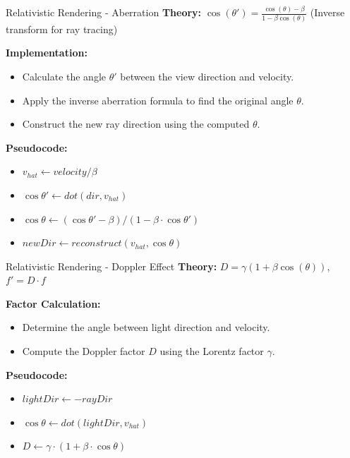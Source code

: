 \documentclass[aspectratio=169,xcolor=dvipsnames]{beamer}
\begin{document}
\begin{frame}{Relativistic Rendering - Aberration}
    \textbf{Theory:} $\cos(\theta') = \frac{\cos(\theta) - \beta}{1 - \beta \cos(\theta)}$ (Inverse transform for ray tracing)
    
    \textbf{Implementation:}
    \begin{itemize}
        \item Calculate the angle $\theta'$ between the view direction and velocity.
        \item Apply the inverse aberration formula to find the original angle $\theta$.
        \item Construct the new ray direction using the computed $\theta$.
    \end{itemize}
    
    \textbf{Pseudocode:}
    \begin{itemize}
        \item $v_{hat} \leftarrow velocity / \beta$
        \item $\cos\theta' \leftarrow dot(dir, v_{hat})$
        \item $\cos\theta \leftarrow (\cos\theta' - \beta) / (1 - \beta \cdot \cos\theta')$
        \item $newDir \leftarrow reconstruct(v_{hat}, \cos\theta)$
    \end{itemize}
\end{frame}

\begin{frame}{Relativistic Rendering - Doppler Effect}
    \textbf{Theory:} $D = \gamma(1 + \beta \cos(\theta))$, $f' = D \cdot f$
    
    \textbf{Factor Calculation:}
    \begin{itemize}
        \item Determine the angle between light direction and velocity.
        \item Compute the Doppler factor $D$ using the Lorentz factor $\gamma$.
    \end{itemize}
    
    \textbf{Pseudocode:}
    \begin{itemize}
        \item $lightDir \leftarrow -rayDir$
        \item $\cos\theta \leftarrow dot(lightDir, v_{hat})$
        \item $D \leftarrow \gamma \cdot (1 + \beta \cdot \cos\theta)$
    \end{itemize}
\end{frame}
\end{document}
